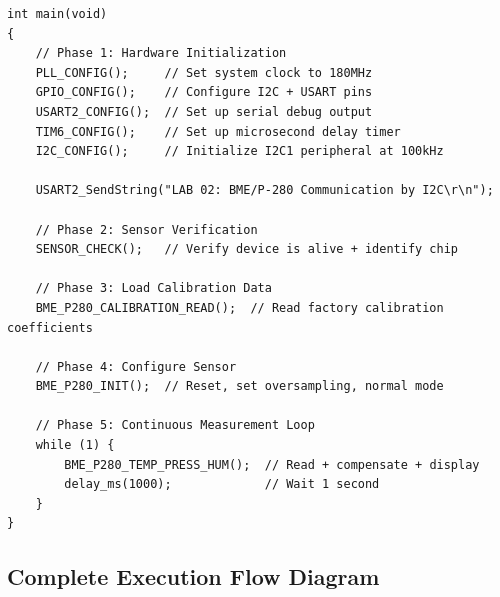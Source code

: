 \documentclass[12pt, a4paper]{article}
\begin{document}
\begin{codebox}
\begin{lstlisting}[style=CStyle]
int main(void)
{
    // Phase 1: Hardware Initialization
    PLL_CONFIG();     // Set system clock to 180MHz
    GPIO_CONFIG();    // Configure I2C + USART pins
    USART2_CONFIG();  // Set up serial debug output
    TIM6_CONFIG();    // Set up microsecond delay timer
    I2C_CONFIG();     // Initialize I2C1 peripheral at 100kHz

    USART2_SendString("LAB 02: BME/P-280 Communication by I2C\r\n");

    // Phase 2: Sensor Verification
    SENSOR_CHECK();   // Verify device is alive + identify chip

    // Phase 3: Load Calibration Data
    BME_P280_CALIBRATION_READ();  // Read factory calibration coefficients

    // Phase 4: Configure Sensor
    BME_P280_INIT();  // Reset, set oversampling, normal mode

    // Phase 5: Continuous Measurement Loop
    while (1) {
        BME_P280_TEMP_PRESS_HUM();  // Read + compensate + display
        delay_ms(1000);             // Wait 1 second
    }
}
\end{lstlisting}
\end{codebox}

\subsection{Complete Execution Flow Diagram}
\end{document}
